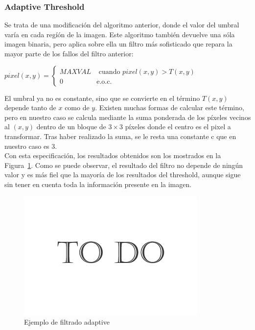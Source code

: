 {	\subsubsection{Adaptive Threshold}
	
	Se trata de una modificación del algoritmo anterior, donde el valor del umbral varía en cada regíón de la imagen. Este algoritmo también devuelve una sóla imagen binaria, pero aplica sobre ella un filtro más sofisticado que repara la mayor parte de los fallos del filtro anterior:

	\begin{center}
		$pixel(x,y) = \left\{
		\begin{array}{cc}
		MAXVAL 	& \text{ cuando } pixel(x,y) > T(x,y)\\ 
		0 	    & 	\text{e.o.c.}
		\end{array}\right.$
	\end{center}
	
	El umbral ya no es constante, sino que se convierte en el término $T(x,y)$ depende tanto de $x$ como de $y$. Existen muchas formas de calcular este término, pero en nuestro caso se calcula mediante la suma ponderada de los píxeles vecinos al $(x,y)$ dentro de un bloque de $3\times3$ píxeles donde el centro es el pixel a transformar. Tras haber realizado la suma, se le resta una constante c que en nuestro caso es 3.\\
	
	Con esta especificación, los resultados obtenidos son los mostrados en la Figura~\ref{fig:adaptive}. Como se puede observar, el resultado del filtro no depende de ningún valor y es más fiel que la mayoría de los resultados del threshold, aunque sigue sin tener en cuenta toda la información presente en la imagen.\\
	
		\begin{figure}[htbp]
		\centering
		\hspace*{-0.3in}
		\includegraphics[scale=0.47]{graphics/todo.png}
		\caption{Ejemplo de filtrado adaptive}
		\label{fig:adaptive}
		\end{figure}
	
}
